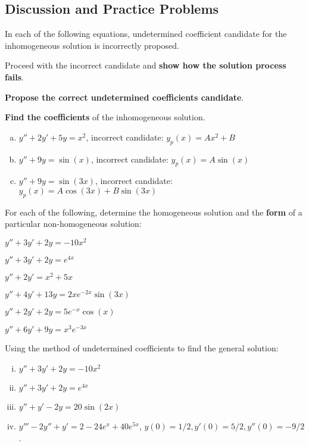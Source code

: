 \subsection*{Discussion and Practice Problems}

\begin{question}
  In each of the following equations, undetermined coefficient candidate for the inhomogeneous solution is incorrectly proposed.
  \begin{compactitem}
  \item Proceed with the incorrect candidate and \textbf{show how the solution process fails}.
  \item \textbf{Propose the correct undetermined coefficients candidate}.
  \item \textbf{Find the coefficients} of the inhomogeneous solution.
  \end{compactitem}
 \begin{enumerate}[(a)]
  \item \(y'' + 2y' + 5y = x^{2}\), incorrect candidate: \(y_{p}(x) = A x^{2} + B\)
  \item \(y'' + 9 y = \sin(x)\), incorrect candidate: \(y_{p}(x) = A \sin(x)\)
  \item \(y'' + 9 y = \sin(3x)\), incorrect candidate: \(y_{p}(x) = A \cos(3x) + B\sin(3x)\)
\end{enumerate}
\end{question}

\begin{question}
For each of the following, determine the homogeneous solution and the \textbf{form} of a particular non-homogeneous solution:
  \begin{colenumerate}
  \item $y''+3y'+2y = -10x^2$
  \item $y''+3y'+2y =e^{4x}$
  \item $y''+2y'=x^2+5x$
  \item $y''+4y'+13y = 2xe^{-2x}\sin(3x)$
  \item $y''+2y'+2y=5e^{-x}\cos(x)$
  \item $y''+6y'+9y = x^3e^{-3x}$
  \end{colenumerate}
\end{question}

\begin{question}
Using the method of undetermined coefficients to find the general solution:
  \begin{enumerate}[(i)]
  \item $y''+3y'+2y=-10x^2$
  \item $y''+3y'+2y =e^{4x}$
  \item $y''+y'-2y = 20\sin(2x)$
  \item $y'''-2y''+y' = 2-24 e^x +40 e^{5x}$, $y(0) = 1/2, y'(0)=5/2, y''(0) = -9/2$.
  \end{enumerate}
\end{question}

